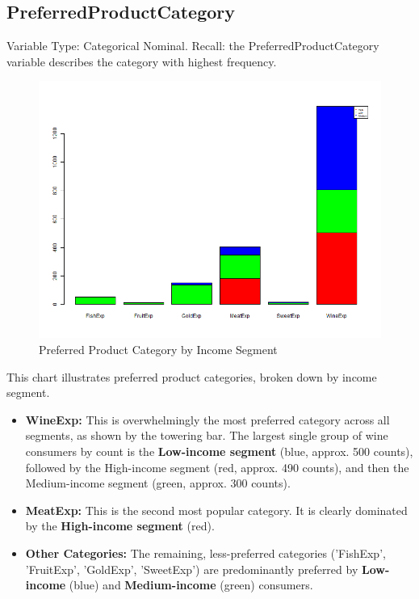 \subsection{PreferredProductCategory}
Variable Type: Categorical Nominal. 
Recall: the PreferredProductCategory variable describes the category with highest frequency.
\begin{figure}[H]
    \centering
    \includegraphics[width= 1\linewidth]{Imatges/stacked_barplot_counts_IncomeSegment_10_legend(category).png}
    \caption{Preferred Product Category by Income Segment}
    \label{fig:scree_plot_11} %
\end{figure}

This chart illustrates preferred product categories, broken down by income segment. 
\begin{itemize}
    \item \textbf{WineExp:} This is overwhelmingly the most preferred category across all segments, as shown by the towering bar. The largest single group of wine consumers by count is the \textbf{Low-income segment} (blue, approx. 500 counts), followed by the High-income segment (red, approx. 490 counts), and then the Medium-income segment (green, approx. 300 counts).
    \item \textbf{MeatExp:} This is the second most popular category. It is clearly dominated by the \textbf{High-income segment} (red).
    \item \textbf{Other Categories:} The remaining, less-preferred categories ('FishExp', 'FruitExp', 'GoldExp', 'SweetExp') are predominantly preferred by \textbf{Low-income} (blue) and \textbf{Medium-income} (green) consumers.
\end{itemize}

